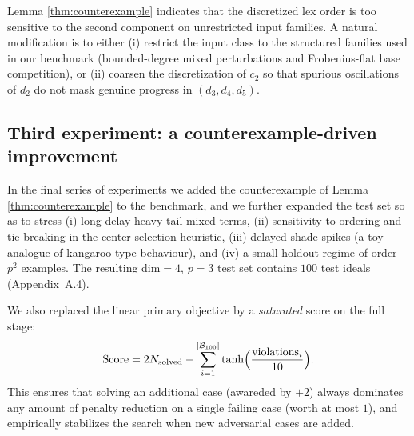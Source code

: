 \documentclass[11pt]{amsart}
\begin{document}
Lemma \ref{thm:counterexample} indicates that the discretized lex order is too sensitive to
the second component on unrestricted input families.
A natural modification is to either (i) restrict the input class to the structured families used in
our benchmark (bounded-degree mixed perturbations and Frobenius-flat base competition), or (ii) coarsen
the discretization of $c_2$ so that spurious oscillations of $d_2$ do not mask genuine progress in
$(d_3,d_4,d_5)$.


\subsection{Third experiment: a counterexample-driven improvement}
\label{subsec:disc-100}

In the final series of experiments we added the counterexample of Lemma \ref{thm:counterexample} to the benchmark, and we further expanded the
test set so as to stress (i) long-delay heavy-tail mixed terms, (ii) sensitivity to ordering and tie-breaking
in the center-selection heuristic, (iii) delayed shade spikes (a toy analogue of kangaroo-type behaviour), and
(iv) a small holdout regime of order $p^2$ examples.
The resulting dim$=4$, $p=3$ test set contains $100$ test ideals (Appendix~A.4).

We also replaced the linear primary objective by a \emph{saturated} score on the full stage:
\[
\mathrm{Score} = 2N_{\mathrm{solved}} - \sum_{i=1}^{|\mathcal B_{100}|} \tanh \Bigl(\frac{\mathrm{violations}_i}{10}\Bigr).
\]
This ensures that solving an additional case (awareded by $+2$) always dominates any amount of penalty reduction on a
single failing case (worth at most $1$), and empirically stabilizes the search when new adversarial cases are added.
\end{document}
